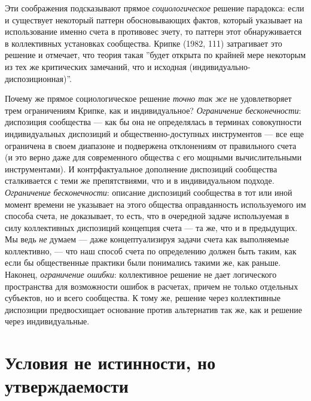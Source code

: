 \documentclass[11pt]{book}
\begin{document}
Эти соображения подсказывают прямое \textit{социологическое} решение парадокса: если и существует некоторый паттерн обосновывающих фактов, который указывает на использование именно счета в противовес зчету, то паттерн этот обнаруживается в коллективных установках сообщества. Крипке (1982, 111) затрагивает это решение и отмечает, что теория такая ''будет открыта по крайней мере некоторым из тех же критических замечаний, что и исходная (индивидуально-диспозиционная)''.

Почему же прямое социологическое решение \textit{точно так же} не удовлетворяет трем ограничениям Крипке, как и индивидуальное? \textit{Ограничение бесконечности}: диспозиция сообщества --- как бы она не определялась в терминах совокупности индивидуальных диспозиций и общественно-доступных инструментов --- все еще ограничена в своем диапазоне и подвержена отклонениям от правильного счета (и это верно даже для современного общества с его мощными вычислительными инструментами). И контрфактуальное дополнение диспозиций сообщества сталкивается с теми же препятствиями, что и в индивидуальном подходе. \textit{Ограничение бесконечности}: описание диспозиций сообщества в тот или иной момент времени не указывает на этого общества оправданность используемого им способа счета, не доказывает, то есть, что в очередной задаче используемая в силу коллективных диспозиций концепция счета --- та же, что и в предыдущих. Мы ведь \textit{не} думаем --- даже концептуализируя задачи счета как выполняемые коллективно, --- что наш способ счета по определению должен быть таким, как если бы общественные практики были понимались такими же, как раньше. Наконец, \textit{ограничение ошибки}: коллективное решение не дает логического пространства для возможности ошибок в расчетах, причем не только отдельных субъектов, но и всего сообщества. К тому же, решение через коллективные диспозиции предвосхищает основание против альтернатив так же, как и решение через индивидуальные.

\section{Условия не истинности, но утверждаемости}
\end{document}
